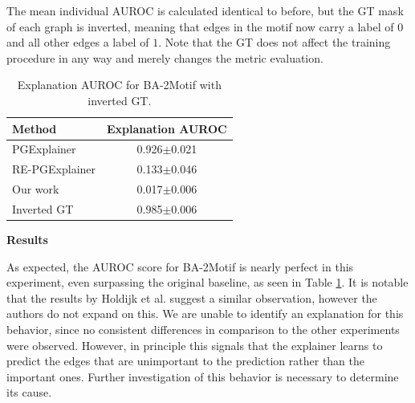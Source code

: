 The mean individual AUROC is calculated identical to before, but the \ac{GT} mask of each graph is inverted, meaning that edges in the motif now carry a label of $0$ and all other edges a label of $1$. 
Note that the \ac{GT} does not affect the training procedure in any way and merely changes the metric evaluation. \bigskip

\begin{table}[ht]
    \centering
    \scriptsize
    \begin{tabularx}{0.45\textwidth}{l c}
        \toprule
        \textbf{Method} & \textbf{Explanation AUROC} \\
        \midrule
        PGExplainer       & 0.926$\pm$0.021 \\
        RE-PGExplainer       & 0.133$\pm$0.046 \\
        Our work       & 0.017$\pm$0.006 \\
        \midrule
        Inverted GT     & 0.985$\pm$0.006 \\
        \bottomrule
    \end{tabularx}
    \caption[Inductive performance on BA-2Motif with inverted \ac{GT}]{Explanation AUROC for BA-2Motif with inverted GT.}
    \label{tab:flippedGT}
\end{table}
\textbf{Results} \par

As expected, the AUROC score for BA-2Motif is nearly perfect in this experiment, even surpassing the original baseline, as seen in Table \ref{tab:flippedGT}. It is notable that the results by Holdijk et al. \cite{holdijk2021re} suggest a similar observation, however the authors do not expand on this. We are unable to identify an explanation for this behavior, since no consistent differences in comparison to the other experiments were observed. However, in principle this signals that the explainer learns to predict the edges that are unimportant to the prediction rather than the important ones. Further investigation of this behavior is necessary to determine its cause. 


